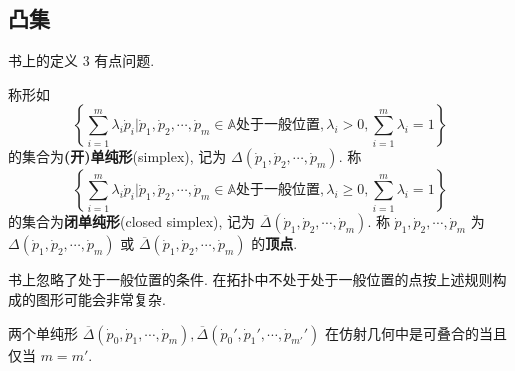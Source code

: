 \documentclass{ctexart}
\begin{document}
\subsection{凸集}
书上的定义 3 有点问题.
\begin{definition}[书上的定义 3]
    称形如
    \[\left\{\sum\limits_{i=1}^m\lambda_i\dot{p}_i\Bigg|\dot{p}_1,\dot{p}_2,\cdots,\dot{p}_m\in\mathbb{A}\text{处于一般位置},\lambda_i>0,\sum\limits_{i=1}^m\lambda_i=1\right\}\]
    的集合为\textbf{(开)单纯形}(simplex), 记为 $\Delta(\dot{p}_1,\dot{p}_2,\cdots,\dot{p}_m)$. 称
    \[\left\{\sum\limits_{i=1}^m\lambda_i\dot{p}_i\Bigg|\dot{p}_1,\dot{p}_2,\cdots,\dot{p}_m\in\mathbb{A}\text{处于一般位置},\lambda_i\geq0,\sum\limits_{i=1}^m\lambda_i=1\right\}\]
    的集合为\textbf{闭单纯形}(closed simplex), 记为 $\overline{\Delta}(\dot{p}_1,\dot{p}_2,\cdots,\dot{p}_m)$. 称 $\dot{p}_1,\dot{p}_2,\cdots,\dot{p}_m$ 为 $\Delta(\dot{p}_1,\dot{p}_2,\cdots,\dot{p}_m)$ 或 $\overline{\Delta}(\dot{p}_1,\dot{p}_2,\cdots,\dot{p}_m)$ 的\textbf{顶点}.
\end{definition}
书上忽略了处于一般位置的条件. 在拓扑中不处于处于一般位置的点按上述规则构成的图形可能会非常复杂.
\begin{theorem}
    两个单纯形 $\overline{\Delta}(\dot{p}_0,\dot{p}_1,\cdots,\dot{p}_m),\overline{\Delta}(\dot{p}_0',\dot{p}_1',\cdots,\dot{p}_{m'}')$ 在仿射几何中是可叠合的当且仅当 $m=m'$.
\end{theorem}
\end{document}
